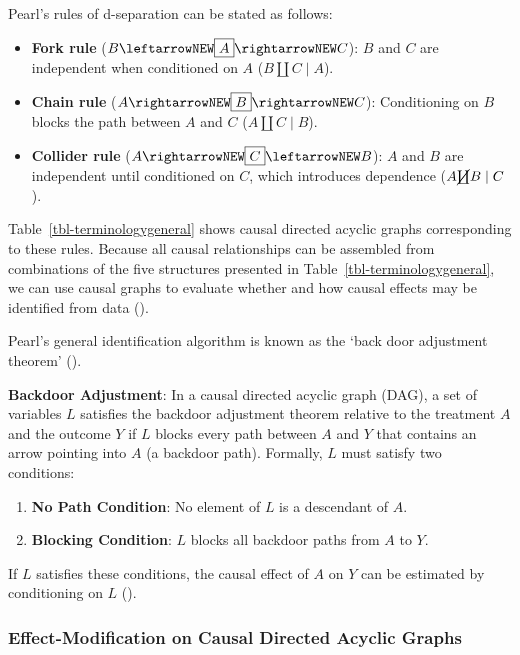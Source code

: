 \documentclass[
  single column]{article}
\providecommand{\tightlist}{%
  \setlength{\itemsep}{0pt}\setlength{\parskip}{0pt}}\usepackage{longtable,booktabs,array}
\begin{document}
Pearl's rules of d-separation can be stated as follows:

\begin{itemize}
\tightlist
\item
  \textbf{Fork rule} (\(B \leftarrowNEW \boxed{A} \rightarrowNEW C\)):
  \(B\) and \(C\) are independent when conditioned on \(A\)
  (\(B \coprod C \mid A\)).
\item
  \textbf{Chain rule} (\(A \rightarrowNEW \boxed{B} \rightarrowNEW C\)):
  Conditioning on \(B\) blocks the path between \(A\) and \(C\)
  (\(A \coprod C \mid B\)).
\item
  \textbf{Collider rule}
  (\(A \rightarrowNEW \boxed{C} \leftarrowNEW B\)): \(A\) and \(B\) are
  independent until conditioned on \(C\), which introduces dependence
  (\(A \cancel{\coprod} B \mid C\)).
\end{itemize}

Table~\ref{tbl-terminologygeneral} shows causal directed acyclic graphs
corresponding to these rules. Because all causal relationships can be
assembled from combinations of the five structures presented in
Table~\ref{tbl-terminologygeneral}, we can use causal graphs to evaluate
whether and how causal effects may be identified from data
().

Pearl's general identification algorithm is known as the `back door
adjustment theorem' ().

\textbf{Backdoor Adjustment}: In a causal directed acyclic graph (DAG),
a set of variables \(L\) satisfies the backdoor adjustment theorem
relative to the treatment \(A\) and the outcome \(Y\) if \(L\) blocks
every path between \(A\) and \(Y\) that contains an arrow pointing into
\(A\) (a backdoor path). Formally, \(L\) must satisfy two conditions:

\begin{enumerate}
\def\labelenumi{\arabic{enumi}.}
\tightlist
\item
  \textbf{No Path Condition}: No element of \(L\) is a descendant of
  \(A\).
\item
  \textbf{Blocking Condition}: \(L\) blocks all backdoor paths from
  \(A\) to \(Y\).
\end{enumerate}

If \(L\) satisfies these conditions, the causal effect of \(A\) on \(Y\)
can be estimated by conditioning on \(\boxed{L}\)
().

\subsubsection{Effect-Modification on Causal Directed Acyclic
Graphs}\label{effect-modification-on-causal-directed-acyclic-graphs}
\end{document}
